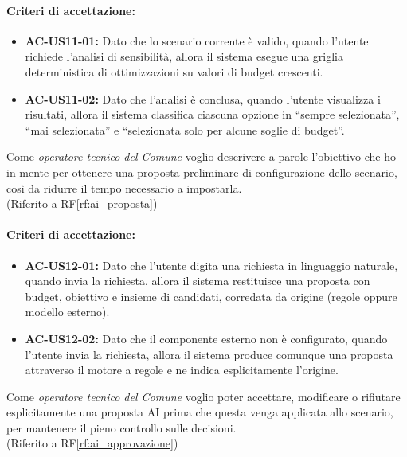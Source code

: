 \paragraph{Criteri di accettazione:}
\begin{itemize}
    \item \textbf{AC-US11-01:} Dato che lo scenario corrente è valido, quando l'utente richiede l'analisi di sensibilità, allora il sistema esegue una griglia deterministica di ottimizzazioni su valori di budget crescenti.
    \item \textbf{AC-US11-02:} Dato che l'analisi è conclusa, quando l'utente visualizza i risultati, allora il sistema classifica ciascuna opzione in ``sempre selezionata'', ``mai selezionata'' e ``selezionata solo per alcune soglie di budget''.
\end{itemize}

 \label{us:ai}
Come \textit{operatore tecnico del Comune} voglio descrivere a parole l'obiettivo che ho in mente per ottenere una proposta preliminare di configurazione dello scenario, così da ridurre il tempo necessario a impostarla. \\ (Riferito a RF\ref{rf:ai_proposta})

\paragraph{Criteri di accettazione:}
\begin{itemize}
    \item \textbf{AC-US12-01:} Dato che l'utente digita una richiesta in linguaggio naturale, quando invia la richiesta, allora il sistema restituisce una proposta con budget, obiettivo e insieme di candidati, corredata da origine (regole oppure modello esterno).
    \item \textbf{AC-US12-02:} Dato che il componente esterno non è configurato, quando l'utente invia la richiesta, allora il sistema produce comunque una proposta attraverso il motore a regole e ne indica esplicitamente l'origine.
\end{itemize}

 \label{us:ai_appr}
Come \textit{operatore tecnico del Comune} voglio poter accettare, modificare o rifiutare esplicitamente una proposta AI prima che questa venga applicata allo scenario, per mantenere il pieno controllo sulle decisioni. \\ (Riferito a RF\ref{rf:ai_approvazione})

